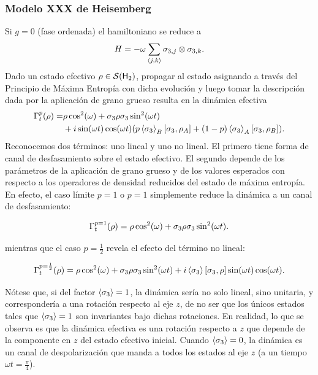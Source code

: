 \subsubsection{Modelo XXX de Heisemberg}

Si $g=0$ (fase ordenada) el hamiltoniano se reduce a
\begin{equation}
    H=-\omega\sum_{\langle j,k \rangle}\sigma_{3,j}\otimes\sigma_{3,k}.\nonumber
\end{equation}
Dado un estado efectivo $\rho\in\mathcal{S}({\sf H}_{2})$, propagar al estado asignando a través del Principio de Máxima Entropía con dicha evolución y luego tomar la descripción dada por la aplicación de grano grueso resulta en la dinámica efectiva
\begin{align*}
    \Gamma_{t}^{p}(\rho)=&\rho \cos^{2}(\omega)+\sigma_{3} \rho \sigma_{3} \sin^{2}(\omega t)\\
    & + i\sin(\omega t)\cos(\omega t)\qty(p\expval{\sigma_{3}}_{B}[\sigma_{3},\rho_{A}]+(1-p)\expval{\sigma_{3}}_{A}[\sigma_{3},\rho_{B}]).
\end{align*}
Reconocemos dos términos: uno lineal y uno no lineal. El primero tiene forma de canal de desfasamiento sobre el estado efectivo. El segundo depende de los parámetros de la aplicación de grano grueso y de los valores esperados con respecto a los operadores de densidad reducidos del estado de máxima entropía. En efecto, el caso límite $p=1$ o $p=1$ simplemente reduce la dinámica a un canal de desfasamiento:

\begin{equation*}
    \Gamma_{t}^{p=1}(\rho)=\rho \cos^{2}(\omega)+\sigma_{3} \rho \sigma_{3} \sin^{2}(\omega t).
\end{equation*}

mientras que el caso $p=\frac{1}{2}$ revela el efecto del término no lineal:

\begin{equation*}
    \Gamma_{t}^{p=\frac{1}{2}}(\rho)=\rho \cos^{2}(\omega)+\sigma_{3} \rho \sigma_{3} \sin^{2}(\omega t) + i\expval{\sigma_{3}} \qty[\sigma_{3},\rho] \sin(\omega t)\cos(\omega t).
\end{equation*}

Nótese que, si del factor $\expval{\sigma_{3}}=1$, la dinámica sería no solo lineal, sino unitaria, y correspondería a una rotación respecto al eje $z$, de no ser que los únicos estados tales que $\expval{\sigma_{3}}=1$ son invariantes bajo dichas rotaciones. En realidad, lo que se observa es que la dinámica efectiva es una rotación respecto a $z$ que depende de la componente en $z$ del estado efectivo inicial. Cuando $\expval{\sigma_{3}}=0$, la dinámica es un canal de despolarización que manda a todos los estados al eje $z$ (a un tiempo $\omega t =\frac{\pi}{4}$). 

